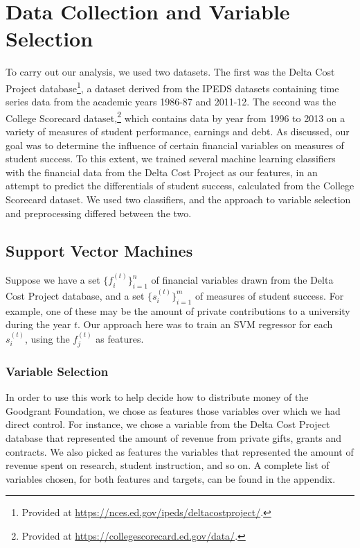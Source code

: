\documentclass[paper.tex]{subfiles}
\begin{document}
\section{Data Collection and Variable Selection}
To carry out our analysis, we used two datasets. The first was the Delta Cost Project database\footnote{Provided at \url{https://nces.ed.gov/ipeds/deltacostproject/}.}, a dataset derived from the IPEDS datasets containing time series data from the academic years 1986-87 and 2011-12. The second was the College Scorecard dataset,\footnote{Provided at \url{https://collegescorecard.ed.gov/data/}.} which contains data by year from 1996 to 2013 on a variety of measures of student performance, earnings and debt. As discussed, our goal was to determine the influence of certain financial variables on measures of student success. To this extent, we trained several machine learning classifiers with the financial data from the Delta Cost Project as our features, in an attempt to predict the differentials of student success, calculated from the College Scorecard dataset. We used two classifiers, and the approach to variable selection and preprocessing differed between the two.

\subsection{Support Vector Machines} 
Suppose we have a set $\{ f_i^{(t)} \}_{i = 1}^n$ of financial variables drawn from the Delta Cost Project database, and a set $\{ s_i^{(t)} \}_{i = 1}^m$ of measures of student success. For example, one of these may be the amount of private contributions to a university during the year $t$. Our approach here was to train an SVM regressor for each $s_i^{(t)}$, using the $f_j^{(t)}$ as features. 
\subsubsection{Variable Selection} 
In order to use this work to help decide how to distribute money of the Goodgrant Foundation, we chose as features those variables over which we had direct control. For instance, we chose a variable from the Delta Cost Project database that represented the amount of revenue from private gifts, grants and contracts. We also picked as features the variables that represented the amount of revenue spent on research, student instruction, and so on. A complete list of variables chosen, for both features and targets, can be found in the appendix.  
\end{document}
